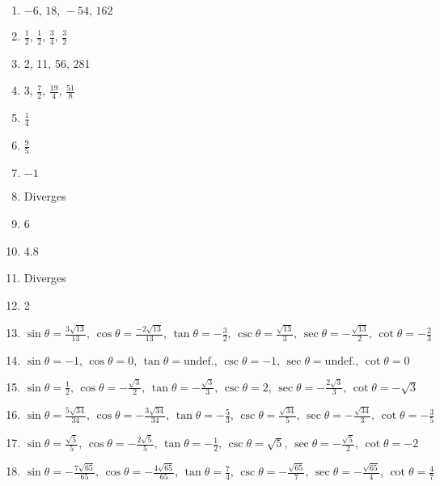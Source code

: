 \documentclass{article}
\begin{document}
\begin{enumerate}
    \item $-6, \, 18, \, -54, \, 162$
    \item $\frac{1}{2}, \, \frac{1}{2}, \, \frac{3}{4}, \, \frac{3}{2}$
    \item 2, 11, 56, 281
    \item $3, \, \frac{7}{2}, \, \frac{19}{4}, \, \frac{51}{8}$
    
    \item $\frac{1}{4}$
    \item $\frac{9}{5}$
    \item $-1$
    \item Diverges
    \item 6
	\item 4.8
	\item Diverges
	\item 2
	
	\item $\sin\theta = \frac{3\sqrt{13}}{13}, \, \cos\theta = \frac{-2\sqrt{13}}{13}, \, \tan\theta = -\frac{3}{2}, \, \csc\theta = \frac{\sqrt{13}}{3}, \, \sec\theta = -\frac{\sqrt{13}}{2}, \, \cot\theta = -\frac{2}{3}$

    \item $\sin\theta = -1, \, \cos\theta = 0, \, \tan\theta = \text{undef.}, \, \csc\theta = -1, \, \sec\theta = \text{undef.}, \, \cot\theta = 0$
    
    \item $\sin\theta = \frac{1}{2}, \, \cos\theta = -\frac{\sqrt{3}}{2}, \, \tan\theta = -\frac{\sqrt{3}}{3}, \, \csc\theta = 2, \, \sec\theta = -\frac{2\sqrt{3}}{3}, \, \cot\theta = -\sqrt{3}$
    
    \item $\sin \theta = \frac{5\sqrt{34}}{34}, \, \cos\theta = -\frac{3\sqrt{34}}{34}, \, \tan\theta = -\frac{5}{3}, \, \csc\theta = \frac{\sqrt{34}}{5}, \, \sec\theta = -\frac{\sqrt{34}}{3}, \, \cot\theta=-\frac{3}{5}$
    
     \item $\sin \theta = \frac{\sqrt{5}}{5}, \, \cos\theta = -\frac{2\sqrt{5}}{5}, \, \tan\theta = -\frac{1}{2}, \, \csc\theta = \sqrt{5}, \, \sec\theta = -\frac{\sqrt{5}}{2}, \, \cot\theta=-2$
    
     \item $\sin \theta = -\frac{7\sqrt{65}}{65}, \, \cos\theta = -\frac{4\sqrt{65}}{65}, \, \tan\theta = \frac{7}{4}, \, \csc\theta = -\frac{\sqrt{65}}{7}, \, \sec\theta = -\frac{\sqrt{65}}{4}, \, \cot\theta= \frac{4}{7}$
     

\end{enumerate}
\end{document}
